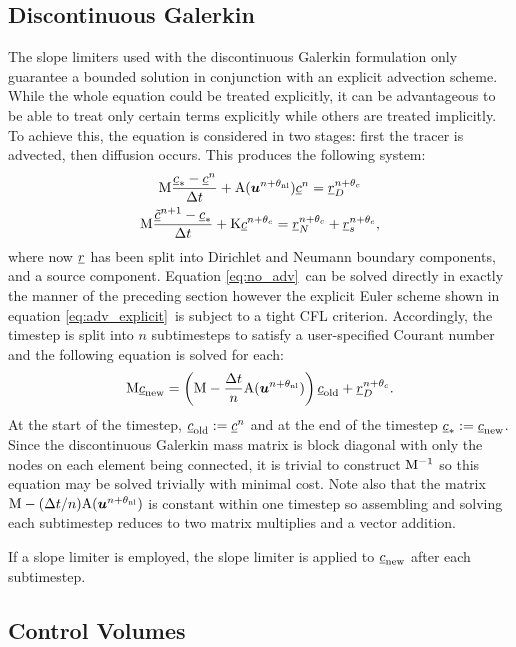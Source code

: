 \subsection{Discontinuous Galerkin}

The slope limiters used with the discontinuous Galerkin formulation only
guarantee a bounded solution in conjunction with an explicit advection
scheme. While the whole equation could be treated explicitly, it can be advantageous
to be able to treat only certain terms explicitly while others are treated implicitly.
To achieve this, the equation is considered in two stages: first the
tracer is advected, then diffusion occurs. This produces the following
system:
\begin{gather}
  \mathrm{M} \frac{\underline{c}_*-\underline{c}^{n}}{\Delta t}
  +\mathrm{A}({\mbox{\boldmath$u$}}^{n+\theta_{\mathrm{nl}}})\underline{c}^{n}=\underline{r}_D^{n+\theta_c}\label{eq:adv_explicit}\\
  \mathrm{M} \frac{\underline{\tilde c}^{n+1}-\underline{c}_*}{\Delta t}
  +\mathrm{K}\underline{c}^{n+\theta_c}=\underline{r}_N^{n+\theta_c}+\underline{r}_s^{n+\theta_c}\label{eq:no_adv},
\end{gather}
where now $\underline{r}$ has been split into Dirichlet and Neumann boundary
components, and a source component. Equation \eqref{eq:no_adv}\ can be
solved directly in exactly the manner of the preceding section however the
explicit Euler scheme shown in equation \eqref{eq:adv_explicit}\ is subject
to a tight CFL criterion. Accordingly, the timestep is split into $n$
subtimesteps to satisfy a user-specified Courant number and the following
equation is solved for each:
\begin{equation}
  \mathrm{M} \underline{c}_{\mathrm{new}}=\left(\mathrm{M}-\frac{\Delta t}{n}\mathrm{A}({\mbox{\boldmath$u$}}^{n+\theta_{\mathrm{nl}}})\right) \underline{c}_{\mathrm{old}}+\underline{r}_D^{n+\theta_c}.
\end{equation}
At the start of the timestep, $\underline{c}_{\mathrm{old}}:=\underline{c}^{n}$ and at the
end of the timestep $\underline{c}_*:=\underline{c}_{\mathrm{new}}$.
Since the discontinuous Galerkin mass matrix is block diagonal with only the
nodes on each element being connected, it is trivial to construct
$\mathrm{M}^{-1}$ so this equation may be solved trivially with minimal cost. Note also that the
matrix $\mathrm{M}-(\Delta t/n)\mathrm{A}({\mbox{\boldmath$u$}}^{n+\theta_{\mathrm{nl}}})$ is constant within one timestep
so assembling and solving each subtimestep reduces to two matrix
multiplies and a vector addition.

If a slope limiter is employed, the slope limiter is applied to
$\underline{c}_{\mathrm{new}}$ after each subtimestep.

\subsection{Control Volumes} \label{sec:cvtemp}

